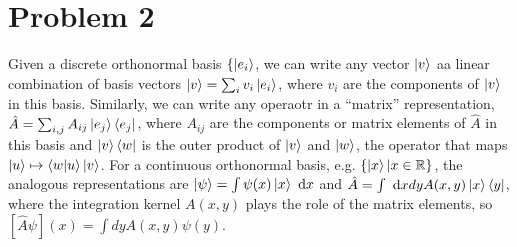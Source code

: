 \documentclass[10pt]{article}
\begin{document}
    \section*{Problem 2}
    Given a discrete orthonormal basis $\{\ket{e_i}$, we can write any vector $\ket v$ aa linear combination of basis vectors $\ket v = \sum_i v_i\ket{e_i}$, where $v_i$ are the components of $\ket v$ in this basis. Similarly, we can write any operaotr in a ``matrix'' representation, $\hat A = \sum_{i, j} A_{ij}\ket{e_j}\bra{e_j}$, where $A_{ij}$ are the components or matrix elements of $\hat A$ in this basis and $\ket{v}\bra{w}$ is the outer product of $\ket v$ and $\ket w$, the operator that maps $\ket u \mapsto \braket{w}{u} \ket v$. For a continuous orthonormal basis, e.g. $\{\ket x | x \in \mathbb R\}$, the analogous representations are $\ket \psi = \int \psi(x) \ket x \ \dd x$ and $\hat A = \int \ \dd x dy A(x, y) \ket x \bra y$, where the integration kernel $A(x, y)$ plays the role of the matrix elements, so $[\hat A \psi](x) = \int dy A(x, y) \psi(y)$. 
\end{document}

